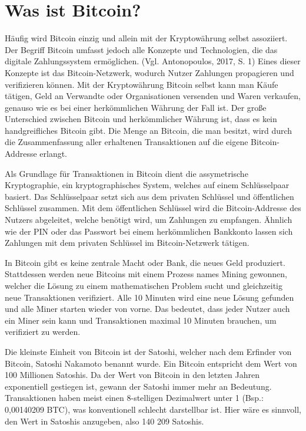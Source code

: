 \section{Was ist Bitcoin?}
Häufig wird Bitcoin einzig und allein mit der Kryptowährung selbst assoziiert. Der Begriff Bitcoin umfasst jedoch alle 
Konzepte und Technologien, die das digitale Zahlungssystem ermöglichen. (Vgl. Antonopoulos, 2017, S. 1) Eines dieser Konzepte ist das Bitcoin-Netzwerk, wodurch
Nutzer Zahlungen propagieren und verifizieren können. Mit der Kryptowährung Bitcoin selbst kann man Käufe tätigen, Geld an 
Verwandte oder Organisationen versenden und Waren verkaufen, genauso wie es bei einer herkömmlichen Währung der Fall ist. Der 
große Unterschied zwischen Bitcoin und herkömmlicher Währung ist, dass es kein handgreifliches Bitcoin gibt. Die Menge an 
Bitcoin, die man besitzt, wird durch die Zusammenfassung aller erhaltenen Transaktionen auf die eigene Bitcoin-Addresse erlangt. 

Als Grundlage für Transaktionen in Bitcoin dient die assymetrische Kryptographie, ein kryptographisches System, welches auf
einem Schlüsselpaar basiert. Das Schlüsselpaar setzt sich aus dem privaten Schlüssel und öffentlichen Schlüssel zusammen. Mit 
dem öffentlichen Schlüssel wird die Bitcoin-Addresse des Nutzers abgeleitet, welche benötigt wird, um Zahlungen zu empfangen. 
Ähnlich wie der PIN oder das Passwort bei einem herkömmlichen Bankkonto lassen sich Zahlungen mit dem privaten Schlüssel 
im Bitcoin-Netzwerk tätigen.

In Bitcoin gibt es keine zentrale Macht oder Bank, die neues Geld produziert. Stattdessen werden neue Bitcoins mit einem Prozess
names Mining gewonnen, welcher die Lösung zu einem mathematischen Problem sucht und gleichzeitig neue Transaktionen verifiziert.
Alle 10 Minuten wird eine neue Lösung gefunden und alle Miner starten wieder von vorne. Das bedeutet, dass jeder Nutzer auch ein
Miner sein kann und Transaktionen maximal 10 Minuten brauchen, um verifiziert zu werden.

Die kleinste Einheit von Bitcoin ist der Satoshi, welcher nach dem Erfinder von Bitcoin, Satoshi Nakamoto benannt wurde. Ein 
Bitcoin entspricht dem Wert von 100 Millionen Satoshis. Da der Wert von Bitcoin in den letzten Jahren exponentiell gestiegen ist,
gewann der Satoshi immer mehr an Bedeutung. Transaktionen haben meist einen 8-stelligen Dezimalwert unter 1 (Bsp.: 0,00140209 BTC),
was konventionell schlecht darstellbar ist. Hier wäre es sinnvoll, den Wert in Satoshis anzugeben, also 140 209 Satoshis.


